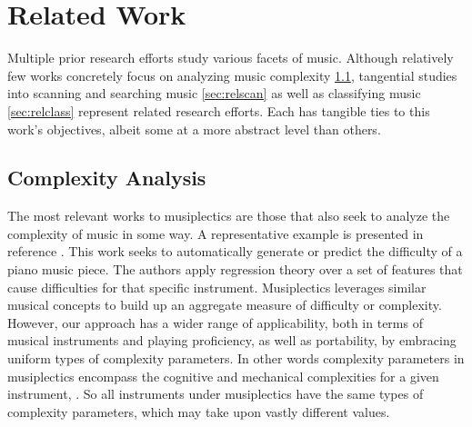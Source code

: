 \documentclass[10pt,preprint]{sigplanconf}
\begin{document}

\section{Related Work} 
\label{sec:related}

Multiple prior research efforts study various facets of music. Although relatively few works concretely focus on analyzing music complexity \ref{sec:relcom}, tangential studies into scanning and searching music \ref{sec:relscan} as well as classifying music \ref{sec:relclass} represent related research efforts. Each has tangible ties to this work's objectives, albeit some at a more abstract level than others.


\subsection{Complexity Analysis}
\label{sec:relcom}

The most relevant works to musiplectics are those that also seek to analyze the complexity of music in some way. A representative example is presented in reference \cite{Chiu2012}. This work seeks to automatically generate or predict the difficulty of a piano music piece. The authors apply regression theory over a set of features  that cause difficulties for that specific instrument. Musiplectics leverages similar musical concepts to build up an aggregate measure of difficulty or complexity. However, our approach has a wider range of applicability, both in terms of musical instruments and playing proficiency, as well as portability, by embracing uniform types of complexity parameters. In other words complexity parameters in musiplectics encompass the cognitive and mechanical complexities for a given instrument, . So all instruments under musiplectics have the same types of complexity parameters, which may take upon vastly different values.
\end{document}
